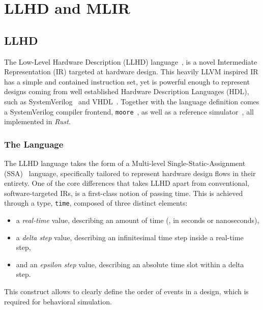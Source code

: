 \chapter{LLHD and MLIR}
\label{ch:ir}


\section{LLHD}
\label{section:llhd}
The Low-Level Hardware Description (LLHD) language~\cite{Schuiki2020, llhd.io}, is a novel Intermediate Representation (IR) targeted at hardware design. This heavily LLVM inspired IR has a simple and contained instruction set, yet is powerful enough to represent designs coming from well established Hardware Description Languages (HDL), such as SystemVerilog~\cite{SV2018} and VHDL~\cite{VHDL2009}. Together with the language definition comes a SystemVerilog compiler frontend, \texttt{moore}~\cite{moore}, as well as a reference simulator~\cite{llhd-sim}, all implemented in \textit{Rust}.


\subsection{The Language}
The LLHD language takes the form of a Multi-level Single-Static-Assignment (SSA)~\cite{Alpern1988} language, specifically tailored to represent hardware design flows in their entirety.
One of the core differences that takes LLHD apart from conventional, software-targeted IRs, is a first-class notion of passing time. This is achieved through a type, \texttt{time}, composed of three distinct elements:

\begin{itemize}
    \item a \textit{real-time} value, describing an amount of time (\eg, in seconds or nanoseconds),
    \item a \textit{delta step} value, describing an infinitesimal time step inside a real-time step,
    \item and an \textit{epsilon step} value, describing an absolute time slot within a delta step.
\end{itemize}

This construct allows to clearly define the order of events in a design, which is required for behavioral simulation.

